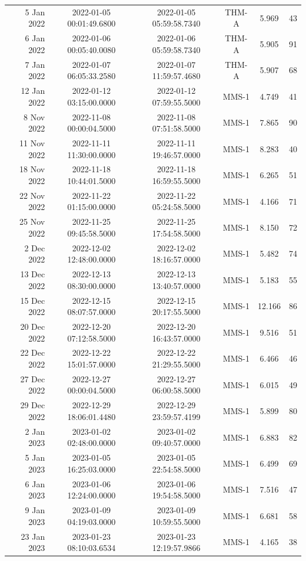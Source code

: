 \begin{longtable}{r|ccccc}
5 Jan 2022     &  2022-01-05 00:01:49.6800 &  2022-01-05 05:59:58.7340 &  THM-A &    5.969 &     43 \\
6 Jan 2022     &  2022-01-06 00:05:40.0080 &  2022-01-06 05:59:58.7340 &  THM-A &    5.905 &     91 \\
7 Jan 2022     &  2022-01-07 06:05:33.2580 &  2022-01-07 11:59:57.4680 &  THM-A &    5.907 &     68 \\
12 Jan 2022    &  2022-01-12 03:15:00.0000 &  2022-01-12 07:59:55.5000 &  MMS-1 &    4.749 &     41 \\
8 Nov 2022     &  2022-11-08 00:00:04.5000 &  2022-11-08 07:51:58.5000 &  MMS-1 &    7.865 &     90 \\
11 Nov 2022    &  2022-11-11 11:30:00.0000 &  2022-11-11 19:46:57.0000 &  MMS-1 &    8.283 &     40 \\
18 Nov 2022    &  2022-11-18 10:44:01.5000 &  2022-11-18 16:59:55.5000 &  MMS-1 &    6.265 &     51 \\
22 Nov 2022    &  2022-11-22 01:15:00.0000 &  2022-11-22 05:24:58.5000 &  MMS-1 &    4.166 &     71 \\
25 Nov 2022    &  2022-11-25 09:45:58.5000 &  2022-11-25 17:54:58.5000 &  MMS-1 &    8.150 &     72 \\
2 Dec 2022     &  2022-12-02 12:48:00.0000 &  2022-12-02 18:16:57.0000 &  MMS-1 &    5.482 &     74 \\
13 Dec 2022    &  2022-12-13 08:30:00.0000 &  2022-12-13 13:40:57.0000 &  MMS-1 &    5.183 &     55 \\
15 Dec 2022    &  2022-12-15 08:07:57.0000 &  2022-12-15 20:17:55.5000 &  MMS-1 &   12.166 &     86 \\
20 Dec 2022    &  2022-12-20 07:12:58.5000 &  2022-12-20 16:43:57.0000 &  MMS-1 &    9.516 &     51 \\
22 Dec 2022    &  2022-12-22 15:01:57.0000 &  2022-12-22 21:29:55.5000 &  MMS-1 &    6.466 &     46 \\
27 Dec 2022    &  2022-12-27 00:00:04.5000 &  2022-12-27 06:00:58.5000 &  MMS-1 &    6.015 &     49 \\
29 Dec 2022    &  2022-12-29 18:06:01.4480 &  2022-12-29 23:59:57.4199 &  MMS-1 &    5.899 &     80 \\
2 Jan 2023     &  2023-01-02 02:48:00.0000 &  2023-01-02 09:40:57.0000 &  MMS-1 &    6.883 &     82 \\
5 Jan 2023     &  2023-01-05 16:25:03.0000 &  2023-01-05 22:54:58.5000 &  MMS-1 &    6.499 &     69 \\
6 Jan 2023     &  2023-01-06 12:24:00.0000 &  2023-01-06 19:54:58.5000 &  MMS-1 &    7.516 &     47 \\
9 Jan 2023     &  2023-01-09 04:19:03.0000 &  2023-01-09 10:59:55.5000 &  MMS-1 &    6.681 &     58 \\
23 Jan 2023    &  2023-01-23 08:10:03.6534 &  2023-01-23 12:19:57.9866 &  MMS-1 &    4.165 &     38 \\
\hline
\end{longtable}
